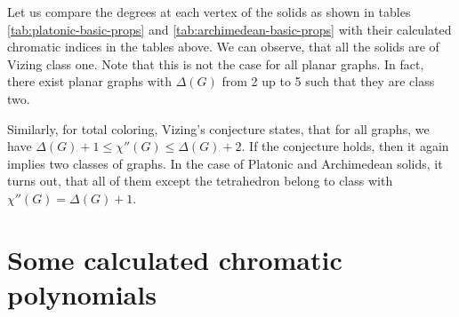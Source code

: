 Let us compare the degrees at each vertex of the solids as shown in tables \ref{tab:platonic-basic-props} and \ref{tab:archimedean-basic-props} with their calculated chromatic indices in the tables above. We can observe, that all the solids are of Vizing class one. Note that this is not the case for all planar graphs. In fact, there exist planar graphs with $\Delta(G)$ from 2 up to 5 such that they are class two.

Similarly, for total coloring, Vizing's conjecture \cite{vizing68} states, that for all graphs, we have $\Delta(G) + 1 \leq \chi''(G) \leq \Delta(G) + 2$. If the conjecture holds, then it again implies two classes of graphs. In the case of Platonic and Archimedean solids, it turns out, that all of them except the tetrahedron belong to class with $\chi''(G) = \Delta(G) + 1$.

\section{Some calculated chromatic polynomials}


